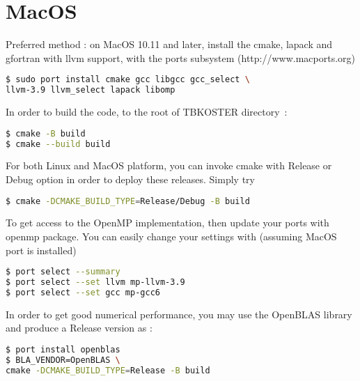 \documentclass[12pt, onecolumn]{memoir}
\begin{document}
\section{MacOS}
Preferred method : on MacOS 10.11 and later, install the cmake, lapack and gfortran with llvm support, with the ports subsystem (http://www.macports.org)
\begin{lstlisting}[language=sh,basicstyle=\small]
$ sudo port install cmake gcc libgcc gcc_select \
llvm-3.9 llvm_select lapack libomp
\end{lstlisting}
In order to build the code, to the root of TBKOSTER directory~:
\begin{lstlisting}[language=sh,basicstyle=\small]
$ cmake -B build
$ cmake --build build
\end{lstlisting}
For both Linux and MacOS platform, you can invoke cmake with Release or Debug option in order to deploy these releases. Simply try
\begin{lstlisting}[language=sh,basicstyle=\small]
$ cmake -DCMAKE_BUILD_TYPE=Release/Debug -B build
\end{lstlisting}
To get access to the OpenMP implementation, then update your ports with openmp package. You can easily change your settings with (assuming MacOS port is installed)
\begin{lstlisting}[language=sh,basicstyle=\small]
$ port select --summary
$ port select --set llvm mp-llvm-3.9
$ port select --set gcc mp-gcc6
\end{lstlisting}
In order to get good numerical performance, you may use the OpenBLAS library and produce a Release version as :
\begin{lstlisting}[language=sh,basicstyle=\small]
$ port install openblas
$ BLA_VENDOR=OpenBLAS \
cmake -DCMAKE_BUILD_TYPE=Release -B build
\end{lstlisting}
\end{document}
